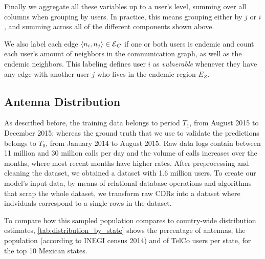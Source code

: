 
Finally we aggregate all these variables up to a user's level, summing over all columns when grouping by users.
In practice, this means grouping either by $j$ or $i$, and summing across all of the different components shown above.

We also label each edge $\left< n_i, n_j \right> \in \operatorname{\mathcal{E}}_C$ if one or both users is endemic and count each user's amount of neighbors in the communication graph, as well as the endemic neighbors.
This labeling defines user $i$ as \textit{vulnerable} whenever they have any edge with another user $j$ who lives in the endemic region $E_Z$.


\subsection{Antenna Distribution}\label{subsection:antenna_distribution}

As described before, the training data belongs to period $T_1$, from August 2015 to December 2015;
whereas the ground truth that we use to validate the predictions belongs to $T_0$, from January 2014 to August 2015.
Raw data logs contain between 11 million and 30 million calls per day and the volume of calls increases over the months, where most recent months have higher rates.
After preprocessing and cleaning the dataset, we obtained a dataset with 1.6 million users.
To create our model's input data, by means of relational database operations and algorithms that scrap the whole dataset, we transform raw CDRs into a dataset where indviduals correspond to a single rows in the dataset.

To compare how this sampled population compares to country-wide distribution estimates,
\cref{tab:distribution_by_state} shows the percentage of antennas, the population (according to INEGI census 2014) and
of TelCo users per state, for the top 10 Mexican states.


